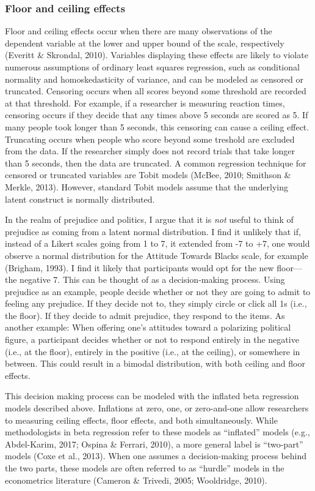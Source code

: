 \documentclass[english,man]{apa6}
\theoremstyle{definition}
\theoremstyle{definition}
\theoremstyle{remark}
\begin{document}
\subsubsection{Floor and ceiling
effects}\label{floor-and-ceiling-effects}

Floor and ceiling effects occur when there are many observations of the
dependent variable at the lower and upper bound of the scale,
respectively (Everitt \& Skrondal, 2010). Variables displaying these
effects are likely to violate numerous assumptions of ordinary least
squares regression, such as conditional normality and homoskedasticity
of variance, and can be modeled as censored or truncated. Censoring
occurs when all scores beyond some threshold are recorded at that
threshold. For example, if a researcher is measuring reaction times,
censoring occurs if they decide that any times above 5 seconds are
scored as 5. If many people took longer than 5 seconds, this censoring
can cause a ceiling effect. Truncating occurs when people who score
beyond some treshold are excluded from the data. If the researcher
simply does not record trials that take longer than 5 seconds, then the
data are truncated. A common regression technique for censored or
truncated variables are Tobit models (McBee, 2010; Smithson \& Merkle,
2013). However, standard Tobit models assume that the underlying latent
construct is normally distributed.

In the realm of prejudice and politics, I argue that it is \emph{not}
useful to think of prejudice as coming from a latent normal
distribution. I find it unlikely that if, instead of a Likert scales
going from 1 to 7, it extended from -7 to +7, one would observe a normal
distribution for the Attitude Towards Blacks scale, for example
(Brigham, 1993). I find it likely that participants would opt for the
new floor---the negative 7. This can be thought of as a decision-making
process. Using prejudice as an example, people decide whether or not
they are going to admit to feeling any prejudice. If they decide not to,
they simply circle or click all 1s (i.e., the floor). If they decide to
admit prejudice, they respond to the items. As another example: When
offering one's attitudes toward a polarizing political figure, a
participant decides whether or not to respond entirely in the negative
(i.e., at the floor), entirely in the positive (i.e., at the ceiling),
or somewhere in between. This could result in a bimodal distribution,
with both ceiling and floor effects.

This decision making process can be modeled with the inflated beta
regression models described above. Inflations at zero, one, or
zero-and-one allow researchers to measuring ceiling effects, floor
effects, and both simultaneously. While methodologists in beta
regression refer to these models as \enquote{inflated} models (e.g.,
Abdel-Karim, 2017; Ospina \& Ferrari, 2010), a more general label is
\enquote{two-part} models (Coxe et al., 2013). When one assumes a
decision-making process behind the two parts, these models are often
referred to as \enquote{hurdle} models in the econometrics literature
(Cameron \& Trivedi, 2005; Wooldridge, 2010).
\end{document}
